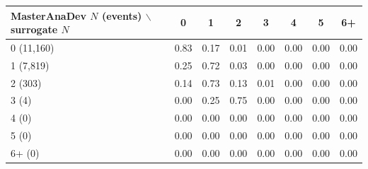 \begin{tabular}{lccccccc}
\toprule
MasterAnaDev $N$ (events) $\backslash$ surrogate $N$ & 0 & 1 & 2 & 3 & 4 & 5 & 6+ \\
\midrule
0 (11,160) & 0.83 & 0.17 & 0.01 & 0.00 & 0.00 & 0.00 & 0.00 \\
1 (7,819) & 0.25 & 0.72 & 0.03 & 0.00 & 0.00 & 0.00 & 0.00 \\
2 (303) & 0.14 & 0.73 & 0.13 & 0.01 & 0.00 & 0.00 & 0.00 \\
3 (4) & 0.00 & 0.25 & 0.75 & 0.00 & 0.00 & 0.00 & 0.00 \\
4 (0) & 0.00 & 0.00 & 0.00 & 0.00 & 0.00 & 0.00 & 0.00 \\
5 (0) & 0.00 & 0.00 & 0.00 & 0.00 & 0.00 & 0.00 & 0.00 \\
6+ (0) & 0.00 & 0.00 & 0.00 & 0.00 & 0.00 & 0.00 & 0.00 \\
\bottomrule
\end{tabular}
